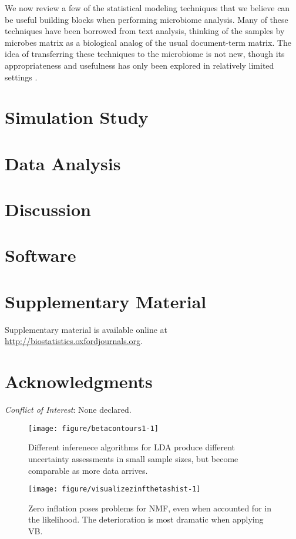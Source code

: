 \documentclass[oupdraft]{bio}
\begin{document}
We now review a few of the statistical modeling techniques that we believe can
be useful building blocks when performing microbiome analysis. Many of these
techniques have been borrowed from text analysis, thinking of the samples by
microbes matrix as a biological analog of the usual document-term matrix. The
idea of transferring these techniques to the microbiome is not new, though its
appropriateness and usefulness has only been explored in relatively limited
settings \cite{shafiei2015biomico, chen2012estimating, holmes2012dirichlet,
  chen2013variable}.

\section{Simulation Study}
\section{Data Analysis}

\section{Discussion}

\section{Software}

\section{Supplementary Material}

Supplementary material is available online at
\url{http://biostatistics.oxfordjournals.org}.

\section*{Acknowledgments}

{\it Conflict of Interest}: None declared.




\begin{figure}[!p]
  \centering\texttt{[image: figure/betacontours1-1]}
  \caption{Different inferenece algorithms for LDA produce different uncertainty
    assessments in small sample sizes, but become comparable as more data arrives.}
  \label{fig:lda_contours}
\end{figure}

\begin{figure}[!p]
  \centering\texttt{[image: figure/visualizezinfthetashist-1]}
  \caption{Zero inflation poses problems for NMF, even when accounted for in the likelihood. The deterioration is most dramatic when applying VB.}
  \label{fig:zinf_thetas}
\end{figure}
\end{document}
